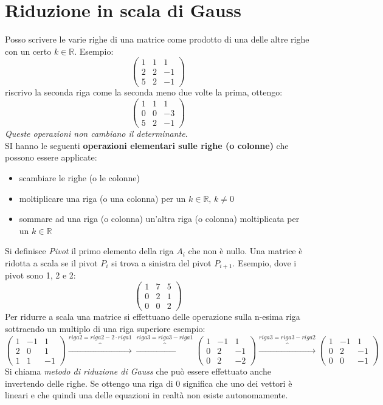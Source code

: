 \documentclass[a4paper,12pt, oneside]{book}
\begin{document}
\section{Riduzione in scala di Gauss}
Posso scrivere le varie righe di una matrice come prodotto di una delle altre righe con un certo $k\in\mathbb{R}$. Esempio:
$$
\left(
\begin{matrix}
1 & 1 & 1\\
2 & 2 & -1\\
5 & 2 & -1
\end{matrix}
\right)
$$
riscrivo la seconda riga come la seconda meno due volte la prima, ottengo:
$$
\left(
\begin{matrix}
1 & 1 & 1\\
0 & 0 & -3\\
5 & 2 & -1
\end{matrix}
\right)
$$
\textit{Queste operazioni non cambiano il determinante}.\\
SI hanno le seguenti \textbf{operazioni elementari sulle righe (o colonne)} che possono essere applicate:
\begin{itemize}
\item scambiare le righe (o le colonne)
\item moltiplicare una riga (o una colonna) per un $k\in \mathbb{R},\, k\neq 0$
\item sommare ad una riga (o colonna) un'altra riga (o colonna) moltiplicata per un $k\in \mathbb{R}$
\end{itemize} 
Si definisce \textit{Pivot} il primo elemento della riga $A_i$ che non è nullo. Una matrice è ridotta a scala se il pivot $P_i$ si trova a sinistra del pivot $P_{i+1}$. Esempio, dove i pivot sono 1, 2 e 2:
$$
\left(\begin{matrix}
1 & 7 & 5\\
0 & 2 & 1\\
0 & 0 & 2
\end{matrix}\right)
$$
Per ridurre a scala una matrice si effettuano delle operazione sulla n-esima riga sottraendo un multiplo di una riga superiore
esempio:
$$
\left(\begin{matrix}
1 & -1 & 1\\
2 & 0 & 1\\
1 & 1 & -1
\end{matrix}\right)\overbrace{\longrightarrow}^{riga2=riga2-2\cdot riga1}\overbrace{\longrightarrow}^{riga3=riga3- riga1}
\left(\begin{matrix}
1 & -1 & 1\\
0 & 2 & -1\\
0 & 2 & -2
\end{matrix}\right)\overbrace{\longrightarrow}^{riga3=riga3- riga2}
\left(\begin{matrix}
1 & -1 & 1\\
0 & 2 & -1\\
0 & 0 & -1
\end{matrix}\right)
$$
Si chiama \textit{metodo di riduzione di Gauss} che può essere effettuato anche invertendo delle righe.
Se ottengo una riga di 0 significa che uno dei vettori è lineari e che quindi una delle equazioni in realtà non esiste autonomamente.
\newpage
\end{document}
